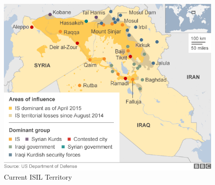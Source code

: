\documentclass{report}
\begin{document}
% 








\begin{figure}[H]
 \centering
 \includegraphics[trim = 0cm 0cm 0cm 0cm, clip,scale=0.5]{./figures/current_territory.png}
   \caption{Current ISIL Territory \cite{BBC2015a,Lewis2014}}
     \label{fig:current_territory}
\end{figure}
\end{document}
